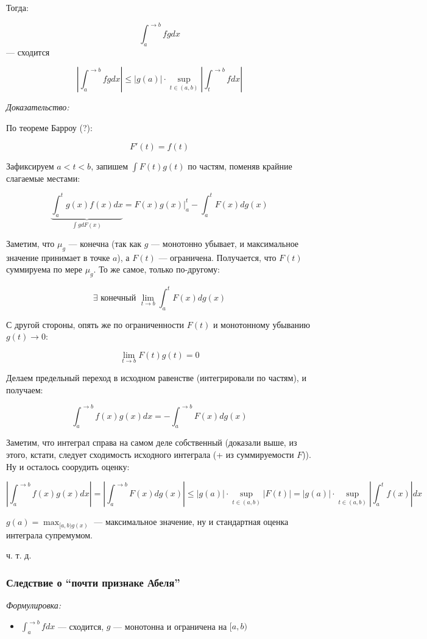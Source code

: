 \documentclass{article}
\begin{document}
Тогда:

\[\int_{a}^{\rightarrow b} fg dx\] --- сходится

\[\left|\int_{a}^{\rightarrow b} fg dx\right| \le |g(a)| \cdot \sup_{t \in (a, b)} \left|\int_{t}^{\rightarrow b} f dx\right|\]

\textit{Доказательство:}

По теореме Барроу (?):

\[F'(t) = f(t)\]

Зафиксируем $a < t < b$, запишем $\int F(t)g(t)$ по частям, поменяв крайние слагаемые местами:

\[\underbrace{\int_a^t g(x) f(x)dx}_{\int g dF(x)} = F(x)g(x)|_a^t - \int_a^t F(x) dg(x)\]

Заметим, что $\mu_g$ --- конечна (так как $g$ --- монотонно убывает, и максимальное значение принимает в точке $a$),  а $F(t)$ --- ограничена. Получается, что $F(t)$ суммируема по мере $\mu_g$. То же самое, только по-другому:

\[\exists \text{ конечный }\lim_{t \rightarrow b} \int_{a}^{t}F(x)dg(x)\]

С другой стороны, опять же по ограниченности $F(t)$ и монотонному убыванию $g(t) \rightarrow 0$:

\[\lim_{t \rightarrow b} F(t)g(t) = 0\]

Делаем предельный переход в исходном равенстве (интегрировали по частям), и получаем:

\[\int_a^{\rightarrow b} f(x)g(x) dx = -\int_a^{\rightarrow b} F(x)dg(x)\]

Заметим, что интеграл справа на самом деле собственный (доказали выше, из этого, кстати, следует сходимость исходного интеграла (+ из суммируемости $F$)). Ну и осталось соорудить оценку:

\[\left|\int_a^{\rightarrow b} f(x)g(x) dx\right| = \left|\int_a^{\rightarrow b} F(x)dg(x)\right| \le |g(a)| \cdot \sup_{t \in (a, b)}|F(t)| = |g(a)| \cdot \sup_{t \in (a, b)} \left|\int_a^t f(x)\right| dx\]

$g(a) = \max_{[a, b) g(x)}$ --- максимальное значение, ну и стандартная оценка интеграла супремумом.

ч. т. д. 

\subsubsection{Следствие о ``почти признаке Абеля''}
\textit{Формулировка:}

\begin{itemize}
    \item $\int_{a}^{\rightarrow b} f dx$ --- сходится, $g$ --- монотонна и ограничена на $[a, b)$
\end{itemize}
\end{document}
